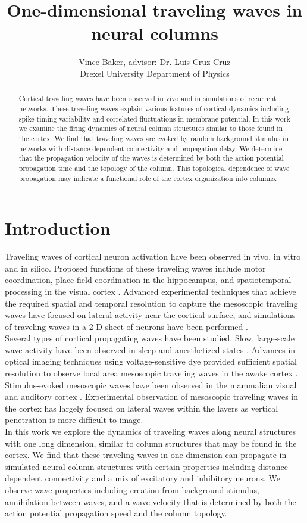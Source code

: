 \documentclass[a4paper,11pt]{article}
\title{One-dimensional traveling waves in neural columns}
\author{Vince Baker, advisor: Dr. Luis Cruz Cruz\\ Drexel University Department of Physics}
\begin{document}
\maketitle

\begin{abstract}
Cortical traveling waves have been observed in vivo and in simulations of recurrent networks.
These traveling waves explain various features of cortical dynamics including spike timing variability and correlated fluctuations in membrane potential.
In this work we examine the firing dynamics of neural column structures similar to those found in the cortex.
We find that traveling waves are evoked by random background stimulus in networks with distance-dependent connectivity and propagation delay.
We determine that the propagation velocity of the waves is determined by both the action potential propagation time and the topology of the column.
This topological dependence of wave propagation may indicate a functional role of the cortex organization into columns.

\end{abstract}

\section{Introduction} 
Traveling waves of cortical neuron activation have been observed in vivo, in vitro and in silico. 
Proposed functions of these traveling waves include motor coordination, place field coordination in the hippocampus, and spatiotemporal processing in the visual cortex \cite{muller2018}. 
Advanced experimental techniques that achieve the required spatial and temporal resolution \cite{shoham1999} to capture the mesoscopic traveling waves have focused on lateral activity near the cortical surface, and simulations of traveling waves in a 2-D sheet of neurons have been performed \cite{keane2015}. 
\\
Several types of cortical propagating waves have been studied.
Slow, large-scale wave activity have been observed in sleep and anesthetized states \cite{muller2018}.
Advances in optical imaging techniques using voltage-sensitive dye provided sufficient spatial resolution to observe local area mesoscopic traveling waves in the awake cortex \cite{wu2008}.
Stimulus-evoked mesoscopic waves have been observed in the mammalian visual and auditory cortex \cite{reimer2010}\cite{muller2018}.
Experimental observation of mesoscopic traveling waves in the cortex has largely focused on lateral waves within the layers \cite{muller2018} as vertical penetration is more difficult to image. 
\\
In this work we explore the dynamics of traveling waves along neural structures with one long dimension, similar to column structures that may be found in the cortex.
We find that these traveling waves in one dimension can propagate in simulated neural column structures with certain properties including distance-dependent connectivity and a mix of excitatory and inhibitory neurons. 
We observe wave properties including creation from background stimulus, annihilation between waves, and a wave velocity that is determined by both the action potential propagation speed and the column topology. 
\end{document}
